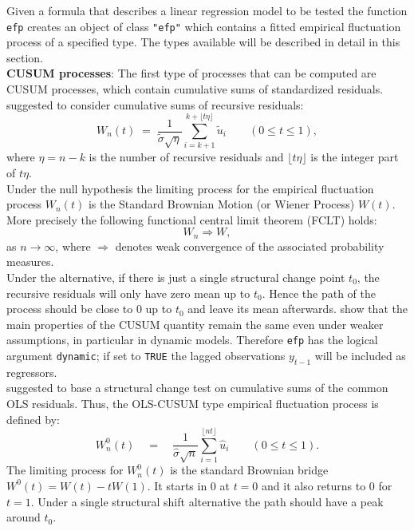 \documentclass[10pt,a4paper]{article}
\begin{document}
Given a formula that describes a linear regression model to be tested the
function {\tt efp} creates an object of class {\tt "efp"} which contains
a fitted empirical fluctuation process of a specified type. The types
available will be described in detail in this section.\\

{\bf CUSUM processes}:
The first type of processes that can be computed are CUSUM processes, which
contain cumulative sums of standardized residuals.
\cite{Z:Brown+Durbin+Evans:1975} suggested to consider cumulative sums of
recursive residuals:
\begin{equation}\label{Rec-CUSUM} W_n(t) \; = \; \frac{1}{\tilde \sigma
\sqrt{\eta}}\sum_{i=k+1}^{k +\lfloor t\eta \rfloor} \tilde u_i \qquad (0
\le t \le 1),\end{equation}
where $\eta = n-k$ is the number of recursive residuals and $\lfloor t\eta
\rfloor$ is the integer part of $t\eta$.\\

Under the null hypothesis the limiting process for the empirical fluctuation
process $W_n(t)$ is the Standard Brownian Motion (or Wiener Process) $W(t)$.
More precisely the following functional central limit theorem (FCLT) holds:
\begin{equation}\label{lim(Rec-CUSUM)}  W_n \Longrightarrow W, \end{equation}
as $n \rightarrow \infty$, where $\Rightarrow$ denotes weak convergence
of the associated probability measures.\\

Under the alternative, if there is just a single structural change point $t_0$,
the recursive residuals will only have zero mean up to $t_0$. Hence the path of
the process should be close to 0 up to $t_0$ and leave its mean afterwards.
\cite{Z:Kraemer+Ploberger+Alt:1988}
show that the main properties of the CUSUM quantity remain the same even under 
weaker assumptions, in particular in dynamic models. Therefore {\tt efp} has the
logical argument {\tt dynamic}; if set to {\tt TRUE} the lagged observations
$y_{t-1}$ will be included as regressors.\\

\cite{Z:Ploberger+Kraemer:1992} suggested to
base a structural change test on cumulative sums of the common OLS residuals.
Thus, the OLS-CUSUM type empirical fluctuation process is defined by:
\begin{equation} \label{OLS-CUSUM} W_n^0(t)
\quad = \quad \frac{1}{\hat \sigma \sqrt{n}} \sum_{i=1}^{\lfloor nt \rfloor}
\hat u_i \qquad (0 \le t \le 1). \end{equation}
The limiting process for $W_n^0(t)$ is the standard Brownian bridge $W^0(t) =
W(t) - t W(1)$. It starts in 0 at $t = 0$ and it also returns to 0 for $t =
1$. Under a single structural shift alternative the path should have a peak
around $t_0$.\\
\end{document}
